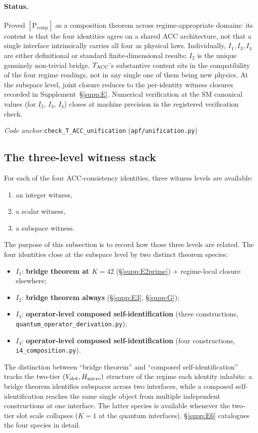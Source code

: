 \documentclass[11pt]{article}
\theoremstyle{plain}
\theoremstyle{definition}
\theoremstyle{remark}
\newcommand{\coderef}[2]{\par\noindent\textit{Code anchor:}\quad\texttt{#1} (\texttt{#2})}
\begin{document}
\paragraph{Status.}
Proved $[\text{P}_{\mathrm{comp}}]$ as a composition theorem across regime-appropriate domains: its content is that the four identities agree on a shared ACC architecture, not that a single interface intrinsically carries all four as physical laws.  Individually, $I_1, I_3, I_4$ are either definitional or standard finite-dimensional results; $I_2$ is the unique genuinely non-trivial bridge.  $T_{\rm ACC}$'s substantive content sits in the compatibility of the four regime readings, not in any single one of them being new physics.  At the subspace level, joint closure reduces to the per-identity witness closures recorded in Supplement~\S\ref{supp:E}.  Numerical verification at the SM canonical values (for $I_2$, $I_3$, $I_4$) closes at machine precision in the registered verification check.

\coderef{check\_T\_ACC\_unification}{apf/unification.py}

\bigskip

\subsection{The three-level witness stack}\label{supp:D6}

For each of the four ACC-consistency identities, three witness levels are available:
\begin{enumerate}[leftmargin=2.5em,label=\textup{(\roman*)}]
  \item an integer witness,
  \item a scalar witness,
  \item a subspace witness.
\end{enumerate}
The purpose of this subsection is to record how those three levels are related.  The four identities close at the subspace level by two distinct theorem species:
\begin{itemize}[leftmargin=2em,itemsep=2pt]
  \item $I_1$: \textbf{bridge theorem at $K = 42$} (\S\ref{supp:E2prime}) + regime-local closure elsewhere;
  \item $I_2$: \textbf{bridge theorem always} (\S\ref{supp:E3}, \S\ref{supp:G});
  \item $I_3$: \textbf{operator-level composed self-identification} (three constructions, \texttt{quantum\_operator\_derivation.py});
  \item $I_4$: \textbf{operator-level composed self-identification} (four constructions, \texttt{i4\_composition.py}).
\end{itemize}
The distinction between ``bridge theorem'' and ``composed self-identification'' tracks the two-tier $(V_{\rm slot}, H_{\rm micro})$ structure of the regime each identity inhabits: a bridge theorem identifies subspaces across two interfaces, while a composed self-identification reaches the same single object from multiple independent constructions at one interface.  The latter species is available whenever the two-tier slot scale collapses ($K = 1$ at the quantum interfaces).  \S\ref{supp:E6} catalogues the four species in detail.
\end{document}
